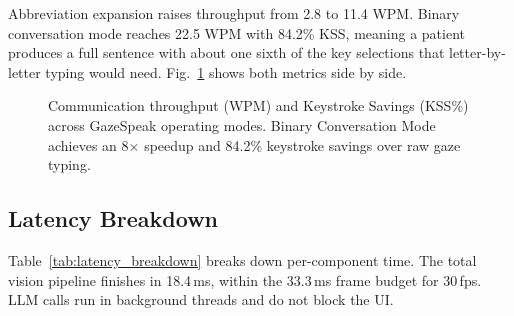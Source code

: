 \documentclass[conference]{IEEEtran}
\begin{document}
Abbreviation expansion raises throughput from 2.8 to 11.4 WPM. Binary conversation mode
reaches 22.5 WPM with 84.2\% KSS, meaning a patient produces a full sentence with about
one sixth of the key selections that letter-by-letter typing would need. Fig.~\ref{fig:wpm_kss}
shows both metrics side by side.

\begin{figure}[htbp]
\centering
{}
\caption{Communication throughput (WPM) and Keystroke Savings (KSS\%) across GazeSpeak operating modes. Binary Conversation Mode achieves an 8$\times$ speedup and 84.2\% keystroke savings over raw gaze typing.}
\label{fig:wpm_kss}
\end{figure}

\subsection{Latency Breakdown}
Table~\ref{tab:latency_breakdown} breaks down per-component time. The total vision pipeline
finishes in 18.4\,ms, within the 33.3\,ms frame budget for 30\,fps. LLM calls run in
background threads and do not block the UI.
\end{document}
